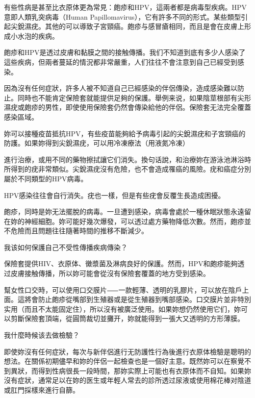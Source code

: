 \documentclass[12pt,UTF8]{ctexbook}
\begin{document}
有些性病是甚至比衣原体更為常見：皰疹和HPV，這兩者都是病毒型疾病。HPV意即人類乳突病毒（Human Papillomavirus），它有許多不同的形式。某些類型引起尖銳濕疣。其他的可以導致子宮頸癌。皰疹与感冒瘡相同，而且是會在皮膚上形成小水泡的疾病。

皰疹和HPV是透过皮膚和黏膜之間的接触傳播。我们不知道到底有多少人感染了這些疾病，但兩者蔓延的情況都非常嚴重，人们往往不會注意到自己已經受到感染。

因為沒有任何症狀，許多人被不知道自己已經感染的伴侶傳染，造成感染難以防止。同時也不能肯定保險套就能提供足夠的保護。舉例来说，如果陰莖根部有尖形濕疣或皰疹的男性，即使使用保險套仍然會傳染給他的伴侶。保險套无法完全覆蓋感染區域。

妳可以接種疫苗抵抗HPV，有些疫苗能夠給予病毒引起的尖銳濕疣和子宮頸癌的防護。如果妳得到尖銳濕疣，可以用冷凍療法（用液氮冷凍）

進行治療，或用不同的藥物擦拭讓它们消失。換句话說，和治療妳在游泳池淋浴時所得到的疣非常類似。尖銳濕疣沒有危險，也不會造成罹癌的風險。疣和癌症分別屬於不同類型的HPV病毒。

HPV感染往往會自行消失。疣也一樣，但是有些疣會反覆生長造成困擾。

皰疹，同時是妳无法擺脫的病毒。一旦遭到感染，病毒會處於一種休眠狀態永遠留在妳的神經細胞。妳可能好幾次爆發，可以透过處方藥物降低次數。然而，皰疹並不危險而且問題往往隨著時間的推移不斷減少。





我该如何保護自己不受性傳播疾病傳染？




保險套提供HIV、衣原体、黴漿菌及淋病良好的保護。然而，HPV和皰疹能夠透过皮膚接触傳播，所以妳可能會從沒有保險套覆蓋的地方受到感染。

幫女性口交時，可以使用口交膜片⸺一款輕薄、透明的乳膠片，可以放在陰戶上面。這將會防止皰疹從嘴部到生殖器或是從生殖器到嘴部感染。口交膜片並非特別实用（而且不太能固定住），所以沒有被廣泛使用。如果妳想仍然使用它们，妳可以剪斷保險套頂端，從圓筒裁切並攤开，妳就能得到一張大又透明的方形薄膜。





我什麼時候该去做檢驗？




即使妳沒有任何症狀，每次与新伴侶進行无防護性行為後進行衣原体檢驗是聰明的想法。在關係初期儘早和妳的伴侶一起檢查也是一個好主意。既然妳可以在察覺不到異狀，而得到性病很長一段時間，那妳实際上可能也有衣原体而不自知。如果妳沒有症狀，通常足以在妳的医生或年輕人常去的診所透过尿液或使用棉花棒对陰道或肛門採樣來進行自篩。
\end{document}
